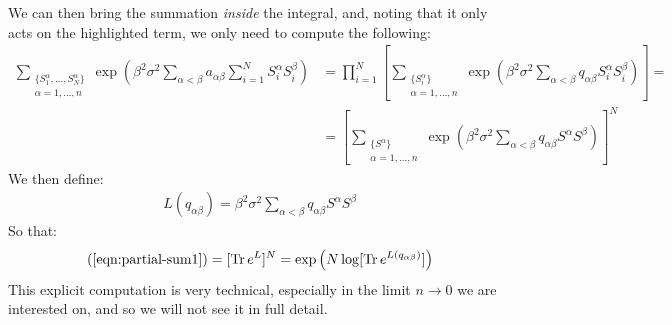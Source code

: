 \documentclass[../template.tex]{subfiles}
\begin{document}
We can then bring the summation \textit{inside} the integral, and, noting that it only acts on the highlighted term, we only need to compute the following:
\begin{align}\nonumber
    \sum_{\substack{\{S_1^\alpha,\dots, S_N^\alpha\}\\ \alpha =1,\dots,n}} \exp\left(\beta^2 \sigma^2 \sum_{\alpha < \beta} a_{\alpha \beta} \sum_{i=1}^N S_i^\alpha S_i^\beta\right) &= \prod_{i=1}^N \left[\sum_{\substack{\{S_i^\alpha\}\\\alpha=1,\dots,n}} \exp\left(\beta^2 \sigma^2 \sum_{\alpha < \beta} q_{\alpha \beta} S_i^\alpha S_i^\beta \right)\right] =\\
    &= \left[\sum_{\substack{\{S^\alpha\}\\ \alpha=1,\dots,n}}
    \exp\left(\beta^2 \sigma^2 \sum_{\alpha < \beta} q_{\alpha \beta} S^\alpha S^\beta\right)
    \right]^N
    \label{eqn:partial-sum1}
\end{align} 
We then define:
\begin{align*}
    L(q_{\alpha \beta})= \beta^2 \sigma^2 \sum_{\alpha < \beta} q_{\alpha \beta} S^\alpha S^\beta
\end{align*}
So that:
\begin{align*}
    (\ref{eqn:partial-sum1}) = [\operatorname{Tr} e^{L}]^N = \exp\left(N \log[\operatorname{Tr} e^{L (q_{\alpha \beta})} ]\right)
\end{align*}
This explicit computation is very technical, especially in the limit $n \to 0$ we are interested on, and so we will not see it in full detail.
\end{document}
